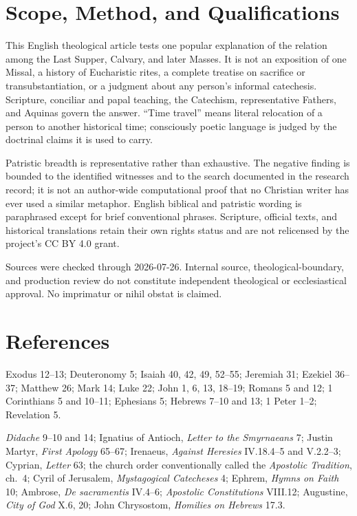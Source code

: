 \begin{deepstudy}
\clearpage
\appendix
\section{Scope, Method, and Qualifications}

This English theological article tests one popular explanation of the relation
among the Last Supper, Calvary, and later Masses. It is not an exposition of one
Missal, a history of Eucharistic rites, a complete treatise on sacrifice or
transubstantiation, or a judgment about any person's informal catechesis.
Scripture, conciliar and papal teaching, the Catechism, representative Fathers,
and Aquinas govern the answer. ``Time travel'' means literal relocation of a
person to another historical time; consciously poetic language is judged by
the doctrinal claims it is used to carry.

Patristic breadth is representative rather than exhaustive. The negative
finding is bounded to the identified witnesses and to the search documented in
the research record; it is not an author-wide computational proof that no
Christian writer has ever used a similar metaphor. English biblical and
patristic wording is paraphrased except for brief conventional phrases.
Scripture, official texts, and historical translations retain their own rights
status and are not relicensed by the project's CC BY 4.0 grant.

Sources were checked through 2026-07-26. Internal source, theological-boundary,
and production review do not constitute independent theological or
ecclesiastical approval. No imprimatur or nihil obstat is claimed.

\section{References}

\begin{description}[style=nextline,leftmargin=0pt,labelsep=0pt]
\item[Scripture]
Exodus 12--13; Deuteronomy 5; Isaiah 40, 42, 49, 52--55; Jeremiah 31;
Ezekiel 36--37; Matthew 26; Mark 14; Luke 22; John 1, 6, 13, 18--19;
Romans 5 and 12; 1 Corinthians 5 and 10--11; Ephesians 5; Hebrews 7--10
and 13; 1 Peter 1--2; Revelation 5.

\item[Early Christian witnesses]
\emph{Didache} 9--10 and 14; Ignatius of Antioch, \emph{Letter to the
Smyrnaeans} 7; Justin Martyr, \emph{First Apology} 65--67; Irenaeus,
\emph{Against Heresies} IV.18.4--5 and V.2.2--3; Cyprian, \emph{Letter}
63; the church order conventionally called the \emph{Apostolic Tradition},
ch.~4; Cyril of Jerusalem, \emph{Mystagogical Catecheses} 4; Ephrem,
\emph{Hymns on Faith} 10; Ambrose, \emph{De sacramentis} IV.4--6;
\emph{Apostolic Constitutions} VIII.12; Augustine, \emph{City of God}
X.6, 20; John Chrysostom, \emph{Homilies on Hebrews} 17.3.


\end{description}
\end{deepstudy}
